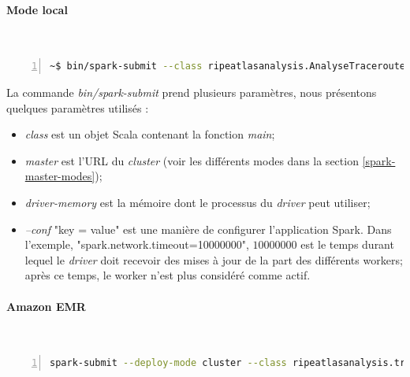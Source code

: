 \paragraph{Mode local}~

\begin{lstlisting}[language=bash,firstnumber=1, caption={Exemple de la soumissions d'un traitement sur Spark},label={lst:submit}, basicstyle = \small,escapechar=|,numbers=left,
stepnumber=1]
~$ bin/spark-submit --class ripeatlasanalysis.AnalyseTraceroute     --master local --driver-memory 30G  --conf "spark.network.timeout=10000000" DelayAnalysis-0.0.5-SNAPSHOT-jar-with-dependencies.jar  1517961600  1518134400 3600 
\end{lstlisting}
La commande \textit{bin/spark-submit} prend plusieurs paramètres, nous présentons quelques paramètres utilisés :
\begin{itemize}
	\item \textit{class} est un objet Scala contenant la fonction \textit{main};
	\item  \textit{master} est l'URL du \textit{cluster} (voir les différents modes dans la section \ref{spark-master-modes});
	\item \textit{driver-memory} est la mémoire dont le processus du \textit{driver} peut utiliser;
	
	\item  \textit{--conf} "key = value" est une manière de configurer l'application Spark. Dans l'exemple, "spark.network.timeout=10000000", $ 10000000 $ est le temps durant lequel le \textit{driver} doit recevoir  des mises à jour de la part des différents workers; après ce temps, le worker n'est plus considéré comme actif.
\end{itemize}

\paragraph{Amazon EMR }~

\begin{lstlisting}[language=bash,firstnumber=1, caption={Exemple de la soumissions d'un traitement sur Spark},label={lst:submitemr}, basicstyle = \small,escapechar=|,numbers=left,
stepnumber=1]
spark-submit --deploy-mode cluster --class ripeatlasanalysis.traceroutesAnalysis s3://amazon-emr-bucket/DelayAnalysis-AWS-EMR-Final-0.0.2-SNAPSHOT-jar-with-dependencies.jar 1517961600 1518048000 3600 s3://ripeatlasdata/traceroute/source=api/af_=4/type_=builtin/msm=5004/year=2018/month=2/day=07 s3://amazon-emr-bucket/resultats
\end{lstlisting}
